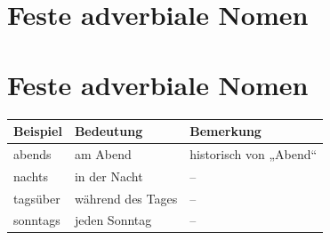 \section*{Feste adverbiale Nomen}


\section{Feste adverbiale Nomen}

\begin{table}[h]
    \centering
    \renewcommand{\arraystretch}{1.3}
    \begin{tabular}{|l|l|p{6cm}|}
        \hline
        \textbf{Beispiel} & \textbf{Bedeutung} & \textbf{Bemerkung}     \\
        \hline
        abends            & am Abend           & historisch von „Abend“ \\
        \hline
        nachts            & in der Nacht       & --                     \\
        \hline
        tagsüber          & während des Tages  & --                     \\
        \hline
        sonntags          & jeden Sonntag      & --                     \\
        \hline
    \end{tabular}
\end{table}